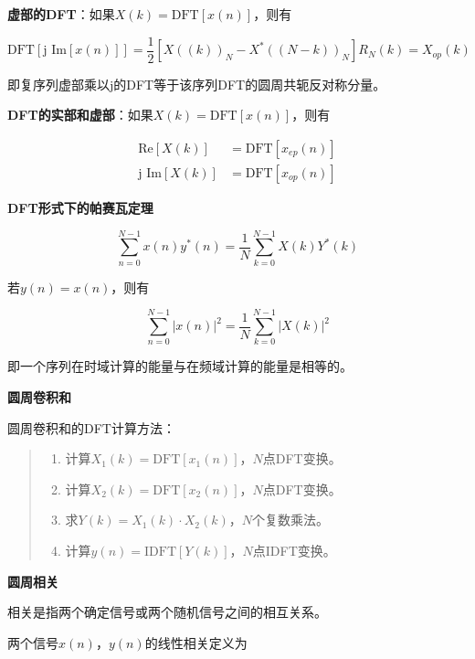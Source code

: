 \documentclass[cn, hazy, blue, normal, 14pt]{elegantnote}
\begin{document}
\textbf{虚部的DFT}：如果$X(k)=\text{DFT}[x(n)]$，则有

\begin{equation}
    \text{DFT}[\text{j Im}[x(n)]]=\frac{1}{2}[X((k))_N-X^*((N-k))_N]R_N(k)=X_{op}(k)
\end{equation}

即复序列虚部乘以j的DFT等于该序列DFT的圆周共轭反对称分量。

\textbf{DFT的实部和虚部}：如果$X(k)=\text{DFT}[x(n)]$，则有

\begin{equation}
\begin{aligned}
    \text{Re}[X(k)]&=\text{DFT}[x_{ep}(n)] \\
    \text{j Im}[X(k)]&=\text{DFT}[x_{op}(n)]
\end{aligned}
\end{equation}

\textbf{DFT形式下的帕赛瓦定理}

\begin{equation}
    \sum_{n=0}^{N-1}{x(n)y^*(n)}=\frac{1}{N}\sum_{k=0}^{N-1}{X(k)Y^*(k)}
\end{equation}

若$y(n)=x(n)$，则有

\begin{equation}
    \sum_{n=0}^{N-1}{|x(n)|^2}=\frac{1}{N}\sum_{k=0}^{N-1}{|X(k)|^2}
\end{equation}

即一个序列在时域计算的能量与在频域计算的能量是相等的。

\textbf{圆周卷积和}

圆周卷积和的DFT计算方法：

\begin{quote}
\begin{enumerate}
    \item 计算$X_1(k)=\text{DFT}[x_1(n)]$，$N$点DFT变换。
    \item 计算$X_2(k)=\text{DFT}[x_2(n)]$，$N$点DFT变换。
    \item 求$Y(k)=X_1(k)\cdot X_2(k)$，$N$个复数乘法。
    \item 计算$y(n)=\text{IDFT}[Y(k)]$，$N$点IDFT变换。
\end{enumerate}
\end{quote}

\textbf{圆周相关}

相关是指两个确定信号或两个随机信号之间的相互关系。

两个信号$x(n)$，$y(n)$的线性相关定义为
\end{document}
